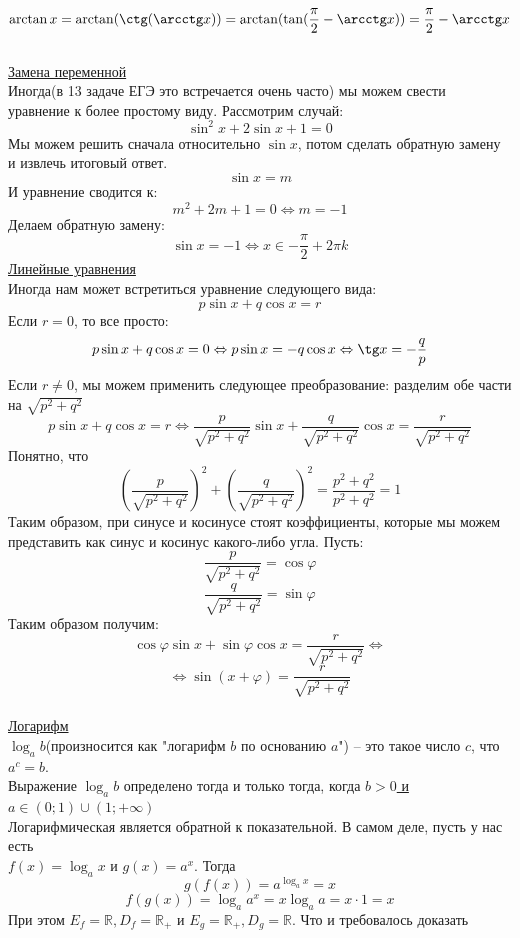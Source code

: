 \documentclass{article}
\begin{document}
\[ \arctan x = \arctan (\ctg (\arcctg x)) = \arctan (\tan(\frac{\pi}{2} - \arcctg x))
 = \frac{\pi}{2} - \arcctg x \]
\\
\underline{Замена переменной}
\\
Иногда(в 13 задаче ЕГЭ это встречается очень часто) мы можем свести
уравнение к более простому виду. Рассмотрим случай:
\[
\sin^2 x + 2 \sin x + 1 = 0
\]
Мы можем решить сначала относительно $\sin x$, потом сделать обратную замену и извлечь итоговый ответ.
\[\sin x = m \]
И уравнение сводится к:
\[m^2 + 2m + 1 = 0
\Leftrightarrow m = -1\]
Делаем обратную замену:
\[
\sin x = -1
\Leftrightarrow
x \in -\frac{\pi}{2} + 2\pi k 
\]
\underline{Линейные уравнения}
\\
Иногда нам может встретиться уравнение следующего 
вида:
\[
p \sin x + q \cos x = r
\]
Если $r = 0$, то все просто:
\[
p \sin x + q \cos x = 0 
\Leftrightarrow
p \sin x = -q \cos x 
\Leftrightarrow
\tg x = - \frac{q}{p}
\]
Если $r \neq 0$, мы можем применить следующее преобразование: разделим обе части на $\sqrt{p^2 + q^2}$
\[
p \sin x + q \cos x = r
\Leftrightarrow
\frac{p}{\sqrt{p^2 + q^2}} \sin x +
\frac{q}{\sqrt{p^2 + q^2}} \cos x = \frac{r}{\sqrt{p^2 + q^2}}
\]
Понятно, что 
\[
\left( \frac{p}{\sqrt{p^2 + q^2}}\right)^2 +
\left( \frac{q}{\sqrt{p^2 + q^2}}\right)^2 =
\frac{p^2 + q^2}{p^2 + q^2} = 1
\]
Таким образом, при синусе и косинусе стоят коэффициенты, которые мы можем представить как 
синус и косинус какого-либо угла. Пусть:
\[
\frac{p}{\sqrt{p^2 + q^2}} = \cos \varphi
\]
\[
\frac{q}{\sqrt{p^2 + q^2}} = \sin \varphi
\]
Таким образом получим:
\[
\cos \varphi \sin x + \sin \varphi \cos x =
\frac{r}{\sqrt{p^2 + q^2}}
\Leftrightarrow
\]
\[
\Leftrightarrow
\sin (x + \varphi) = \frac{r}{\sqrt{p^2 + q^2}}
\]
\\
\underline{Логарифм}
\\
$\log_a b$(произносится как "логарифм $b$ по основанию $a$") -- это такое
число $c$, что $a^c = b$. 
\\
Выражение  \( \log_a b\) определено
тогда и только тогда, когда \underline{\( b > 0\)  и  \( a \in (0; 1) \cup (1;+\infty) \)} 
\\
Логарифмическая является обратной к показательной.
В самом деле, пусть у нас есть \\ \( f(x) = \log_a x \text{ и } g(x) = a^x \). Тогда 
\[ g(f(x)) = a^{\log_a x}  = x \]
\[ f(g(x)) = \log_a a^x = x \log_a a = x \cdot 1 = x \]
При этом \( E_f = \mathbb{R}, D_f = \mathbb{R}_+\) и 
\( E_g = \mathbb{R}_+, D_g = \mathbb{R}\). Что и требовалось доказать 
\\ \\
\end{document}
